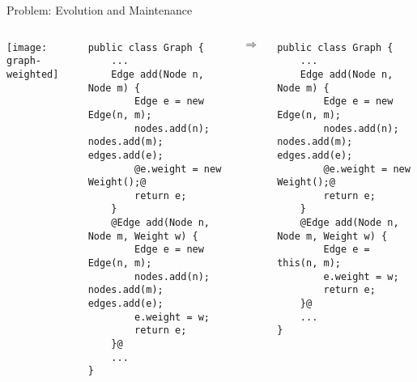 \begin{frame}[fragile]{Problem: Evolution and Maintenance}
	\begin{columns}
			\texttt{[image: graph-weighted]}
\begin{tiny}
\begin{lstlisting}
public class Graph {
	...
	Edge add(Node n, Node m) {
		Edge e = new Edge(n, m);
		nodes.add(n); nodes.add(m); edges.add(e);
		@e.weight = new Weight();@
		return e;
	}
	@Edge add(Node n, Node m, Weight w) {
		Edge e = new Edge(n, m);
		nodes.add(n); nodes.add(m); edges.add(e);
		e.weight = w;
		return e;
	}@
	...
}
\end{lstlisting}
\end{tiny}
			\begin{LARGE}
				$\Rightarrow$
			\end{LARGE}
\begin{tiny}
\begin{lstlisting}
public class Graph {
	...
	Edge add(Node n, Node m) {
		Edge e = new Edge(n, m);
		nodes.add(n); nodes.add(m); edges.add(e);
		@e.weight = new Weight();@
		return e;
	}
	@Edge add(Node n, Node m, Weight w) {
		Edge e = this(n, m);
		e.weight = w;
		return e;
	}@
	...
}
\end{lstlisting}
\end{tiny}
	\end{columns}
\end{frame}


